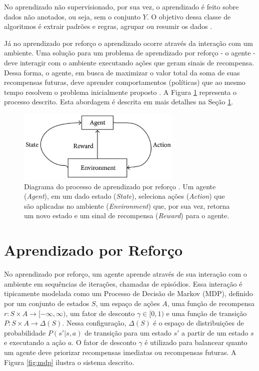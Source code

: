 No aprendizado não supervisionado, por sua vez, o aprendizado é feito sobre dados não anotados, ou seja, sem o conjunto $Y$. O objetivo dessa classe de algoritmos é extrair padrões e regras, agrupar ou resumir os dados \cite{Russel}.

Já no aprendizado por reforço o aprendizado ocorre através da interação com um ambiente. Uma solução para um problema de aprendizado por reforço - o agente - deve interagir com o ambiente executando ações que geram sinais de recompensa. Dessa forma, o agente, em busca de maximizar o valor total da soma de suas recompensas futuras, deve aprender comportamentos (políticas) que ao mesmo tempo resolvem o problema inicialmente proposto \cite{Russel}. A Figura \ref{fig:reinforcementfig} representa o processo descrito. Esta abordagem é descrita em mais detalhes na Seção \ref{sec:reinforcementlearning}.
\begin{figure}[ht]
 \centering
  \includegraphics[width=0.70\textwidth]{./fig/Framework-of-reinforcement-learning-Agent-selects-an-action-the-environment-responds-to}
  \captionsetup{width=1\textwidth}
  \caption[Diagrama do processo de aprendizado por reforço \cite{ZhouXiaoke}.]{Diagrama do processo de aprendizado por reforço \cite{ZhouXiaoke}. Um agente (\textit{Agent}), em um dado estado (\textit{State}), seleciona ações (\textit{Action}) que são aplicadas no ambiente (\textit{Environment}) que, por sua vez, retorna um novo estado e um sinal de recompensa (\textit{Reward}) para o agente.}
 \label{fig:reinforcementfig}
\end{figure}


\section{Aprendizado por Reforço}
\label{sec:reinforcementlearning}

No aprendizado por reforço, um agente aprende através de sua interação com o ambiente em sequências de iterações, chamadas de episódios. Essa interação é tipicamente modelada como um Processo de Decisão de Markov (MDP), definido por um conjunto de estados $S$, um espaço de ações $A$, uma função de recompensa $r: S \times A \rightarrow [-\infty, \infty)$, um fator de desconto $\gamma \in [0, 1)$ e uma função de transição $P: S \times A \rightarrow \Delta(S)$. Nessa configuração, $\Delta(S)$ é o espaço de distribuições de probabilidade $P(s'|s, a)$ de transição para um estado $s'$ a partir de um estado $s$ e executando a ação $a$. O fator de desconto $\gamma$ é utilizado para balancear quanto um agente deve priorizar recompensas imediatas ou recompensas futuras. A Figura \ref{fig:mdp} ilustra o sistema descrito.

